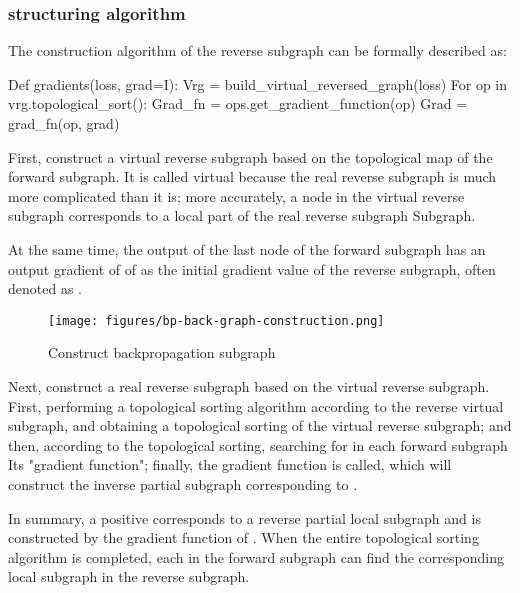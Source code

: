 \begin{content}
\subsubsection{structuring algorithm}

The construction algorithm of the reverse subgraph can be formally described as:

\begin{leftbar}
\begin{python}
Def gradients(loss, grad=I):
  Vrg = build_virtual_reversed_graph(loss)
  For op in vrg.topological_sort():
    Grad_fn = ops.get_gradient_function(op)
    Grad = grad_fn(op, grad)
\end{python}
\end{leftbar}

First, construct a virtual reverse subgraph based on the topological map of the forward subgraph. It is called virtual because the real reverse subgraph is much more complicated than it is; more accurately, a node in the virtual reverse subgraph corresponds to a local part of the real reverse subgraph Subgraph.

At the same time, the output of the last node of the forward subgraph has an output gradient of  of  as the initial gradient value of the reverse subgraph, often denoted as .

\begin{figure}[!htbp]
\centering
\texttt{[image: figures/bp-back-graph-construction.png]}
\caption{Construct backpropagation subgraph}
 \label{fig:bp-back-graph-construction}
\end{figure}

Next, construct a real reverse subgraph based on the virtual reverse subgraph. First, performing a topological sorting algorithm according to the reverse virtual subgraph, and obtaining a topological sorting of the virtual reverse subgraph; and then, according to the topological sorting, searching for  in each forward subgraph Its "gradient function"; finally, the gradient function is called, which will construct the inverse partial subgraph corresponding to .

In summary, a positive  corresponds to a reverse partial local subgraph and is constructed by the gradient function of . When the entire topological sorting algorithm is completed, each  in the forward subgraph can find the corresponding local subgraph in the reverse subgraph.


\end{content}
